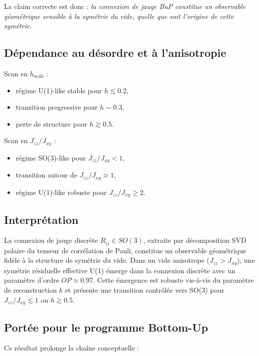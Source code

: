 \documentclass[11pt]{article}
\begin{document}
La claim correcte est donc : \textit{la connexion de jauge BuP constitue un observable géométrique sensible à la symétrie du vide, quelle que soit l'origine de cette symétrie}.

\subsection{Dépendance au désordre et à l'anisotropie}

Scan en $h_{\mathrm{scale}}$ :

\begin{itemize}
\item régime U(1)-like stable pour $h \lesssim 0.2$,
\item transition progressive pour $h \sim 0.3$,
\item perte de structure pour $h \gtrsim 0.5$.
\end{itemize}

Scan en $J_{zz}/J_{xy}$ :

\begin{itemize}
\item régime SO(3)-like pour $J_{zz}/J_{xy} < 1$,
\item transition autour de $J_{zz}/J_{xy} \approx 1$,
\item régime U(1)-like robuste pour $J_{zz}/J_{xy} \geq 2$.
\end{itemize}

\subsection{Interprétation}

La connexion de jauge discrète $R_{ij} \in SO(3)$, extraite par décomposition SVD polaire du tenseur de corrélation de Pauli, constitue un observable géométrique fidèle à la structure de symétrie du vide. Dans un vide anisotrope ($J_{zz} > J_{xy}$), une symétrie résiduelle effective U(1) émerge dans la connexion discrète avec un paramètre d'ordre $OP \approx 0.97$. Cette émergence est robuste vis-à-vis du paramètre de reconstruction $k$ et présente une transition contrôlée vers SO(3) pour $J_{zz}/J_{xy} \lesssim 1$ ou $h \gtrsim 0.5$.

\subsection{Portée pour le programme Bottom-Up}

Ce résultat prolonge la chaîne conceptuelle :
\end{document}
